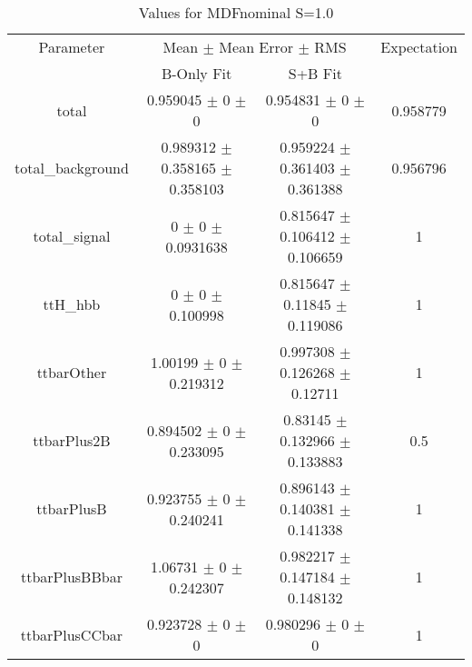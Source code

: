 \begin{table}
\centering
\caption{Values for MDFnominal S=1.0}
\begin{tabular}{cccc}
\toprule
Parameter & \multicolumn{2}{c}{Mean $\pm$ Mean Error $\pm$ RMS} & Expectation\\
 & B-Only Fit & S+B Fit & \\
\midrule
total & \num{0.959045} $\pm$ \num{0} $\pm$ \num{0} & \num{0.954831} $\pm$ \num{0} $\pm$ \num{0} & \num{0.958779}\\
total\_background & \num{0.989312} $\pm$ \num{0.358165} $\pm$ \num{0.358103} & \num{0.959224} $\pm$ \num{0.361403} $\pm$ \num{0.361388} & \num{0.956796}\\
total\_signal & \num{0} $\pm$ \num{0} $\pm$ \num{0.0931638} & \num{0.815647} $\pm$ \num{0.106412} $\pm$ \num{0.106659} & \num{1}\\
ttH\_hbb & \num{0} $\pm$ \num{0} $\pm$ \num{0.100998} & \num{0.815647} $\pm$ \num{0.11845} $\pm$ \num{0.119086} & \num{1}\\
ttbarOther & \num{1.00199} $\pm$ \num{0} $\pm$ \num{0.219312} & \num{0.997308} $\pm$ \num{0.126268} $\pm$ \num{0.12711} & \num{1}\\
ttbarPlus2B & \num{0.894502} $\pm$ \num{0} $\pm$ \num{0.233095} & \num{0.83145} $\pm$ \num{0.132966} $\pm$ \num{0.133883} & \num{0.5}\\
ttbarPlusB & \num{0.923755} $\pm$ \num{0} $\pm$ \num{0.240241} & \num{0.896143} $\pm$ \num{0.140381} $\pm$ \num{0.141338} & \num{1}\\
ttbarPlusBBbar & \num{1.06731} $\pm$ \num{0} $\pm$ \num{0.242307} & \num{0.982217} $\pm$ \num{0.147184} $\pm$ \num{0.148132} & \num{1}\\
ttbarPlusCCbar & \num{0.923728} $\pm$ \num{0} $\pm$ \num{0} & \num{0.980296} $\pm$ \num{0} $\pm$ \num{0} & \num{1}\\
\bottomrule
\end{tabular}
\end{table}